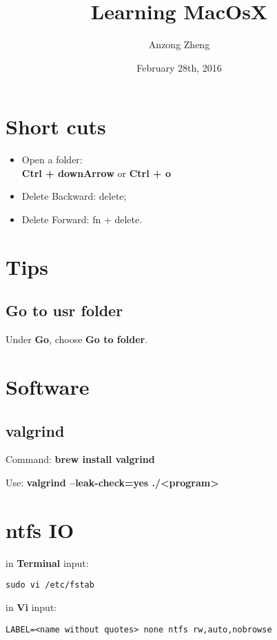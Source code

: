 \documentclass[10pt,a4paper]{article}
\begin{document}
\author{Anzong Zheng}
\title{Learning MacOsX}
\date{February 28th, 2016}
\maketitle
\newpage
	
	
\tableofcontents
\newpage
	
\section{Short cuts}
\begin{itemize}
	\item Open a folder: \\
		\textbf{Ctrl + downArrow} or \textbf{Ctrl + o}
	\item Delete Backward: delete;
	\item Delete Forward: fn + delete.
\end{itemize}

\section{Tips}
\subsection{Go to usr folder}
Under \textbf{Go}, choose \textbf{Go to folder}.

\section{Software}
\subsection{valgrind}
Command: \textbf{brew install valgrind}

Use: \textbf{valgrind --leak-check=yes ./<program>}

\section{ntfs IO}

in \textbf{Terminal} input:

\begin{lstlisting}
sudo vi /etc/fstab
\end{lstlisting}

in \textbf{Vi} input:

\begin{lstlisting}
LABEL=<name without quotes> none ntfs rw,auto,nobrowse
\end{lstlisting}
\end{document}
